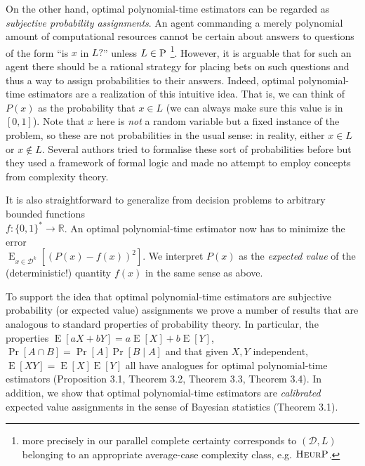 \documentclass{article}
\numberwithin{equation}{section}
\theoremstyle{definition}
\theoremstyle{plain}
\newcommand{\Bool}{\{0,1\}}
\newcommand{\Words}{{\Bool^*}}
\DeclareMathOperator{\Prb}{Pr}
\DeclareMathOperator{\E}{E}
\newcommand{\Reals}{\mathbb{R}}
\newcommand{\Dist}{\mathcal{D}}
\begin{document}
On the other hand, optimal polynomial-time estimators can be regarded as \emph{subjective probability assignments}. An agent commanding a merely polynomial amount of computational resources cannot be certain about answers to questions of the form \enquote{is ${x}$ in ${L}?$} unless ${L \in\textsc{P}}$ \footnote{more precisely in our parallel complete certainty corresponds to ${(\Dist,L)}$ belonging to an appropriate average-case complexity class, e.g. ${\textsc{HeurP}}$.}. However, it is arguable that for such an agent there should be a rational strategy for placing bets on such questions and thus a way to assign probabilities to their answers. Indeed, optimal polynomial-time estimators are a realization of this intuitive idea. That is, we can think of ${P(x)}$ as the probability that ${x \in L}$ (we can always make sure this value is in ${[0,1]}$). Note that ${x}$ here is \emph{not} a random variable but a fixed instance of the problem, so these are not probabilities in the usual sense: in reality, either ${x \in L}$ or ${x \not\in L}$. Several authors tried to formalise these sort of probabilities before \cite{Gaifman_2004,Hutter_2013,Demski_2012,Christiano_2014,Garrabrant_2015} but they used a framework of formal logic and made no attempt to employ concepts from complexity theory.

It is also straightforward to generalize from decision problems to arbitrary bounded functions\\ ${f: \Words \rightarrow \Reals}$. An optimal polynomial-time estimator now has to minimize the error\\ ${\E_{x \in \Dist^k}[(P(x)-f(x))^2]}$. We interpret ${P(x)}$ as the \emph{expected value} of the (deterministic!) quantity ${f(x)}$ in the same sense as above. 

To support the idea that optimal polynomial-time estimators are subjective probability (or expected value) assignments we prove a number of results that are analogous to standard properties of probability theory. In particular, the properties ${\E[a X+b Y]=a \E[X] + b\E[Y]}$, ${\Pr[A \cap B] = \Prb[A] \Prb[B \mid A]}$ and that given ${X,Y}$ independent, ${\E[XY] = \E[X]\E[Y]}$ all have analogues for optimal polynomial-time estimators (Proposition 3.1, Theorem 3.2, Theorem 3.3, Theorem 3.4). In addition, we show that optimal polynomial-time estimators are \emph{calibrated} expected value assignments in the sense of Bayesian statistics (Theorem 3.1).
\end{document}
